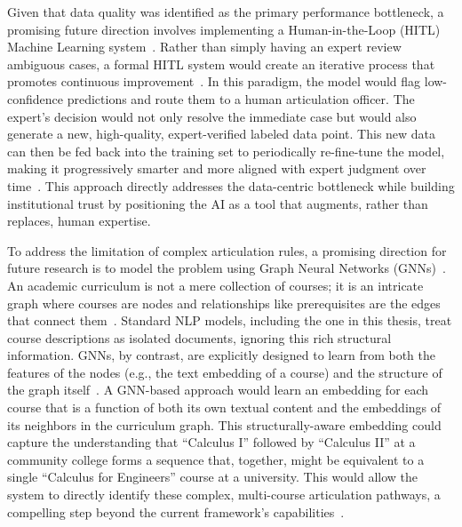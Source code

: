 Given that data quality was identified as the primary performance bottleneck, a promising future direction involves implementing a Human-in-the-Loop (HITL) Machine Learning system~\cite{WU2022364}. Rather than simply having an expert review ambiguous cases, a formal HITL system would create an iterative process that promotes continuous improvement~\cite{10.5555/3061053.3061219,wang2019}. In this paradigm, the model would flag low-confidence predictions and route them to a human articulation officer. The expert's decision would not only resolve the immediate case but would also generate a new, high-quality, expert-verified labeled data point. This new data can then be fed back into the training set to periodically re-fine-tune the model, making it progressively smarter and more aligned with expert judgment over time~\cite{Settles2009ActiveLL,wang2022humanintheloopmachinelearningmacromicro}. This approach directly addresses the data-centric bottleneck while building institutional trust by positioning the AI as a tool that augments, rather than replaces, human expertise.

To address the limitation of complex articulation rules, a promising direction for future research is to model the problem using Graph Neural Networks (GNNs)~\cite{kipf2017semisupervisedclassificationgraphconvolutional, hamilton2018inductiverepresentationlearninglarge}. An academic curriculum is not a mere collection of courses; it is an intricate graph where courses are nodes and relationships like prerequisites are the edges that connect them~\cite{zhang2023curriculum, wang2025generativecontrastiveheterogeneousgraphneural}. Standard NLP models, including the one in this thesis, treat course descriptions as isolated documents, ignoring this rich structural information. GNNs, by contrast, are explicitly designed to learn from both the features of the nodes (e.g., the text embedding of a course) and the structure of the graph itself~\cite{veličković2018graphattentionnetworks, s23084168}. A GNN-based approach would learn an embedding for each course that is a function of both its own textual content and the embeddings of its neighbors in the curriculum graph. This structurally-aware embedding could capture the understanding that ``Calculus I'' followed by ``Calculus II'' at a community college forms a sequence that, together, might be equivalent to a single ``Calculus for Engineers'' course at a university. This would allow the system to directly identify these complex, multi-course articulation pathways, a compelling step beyond the current framework's capabilities~\cite{Yan_2024, zhang2023curriculum}.

